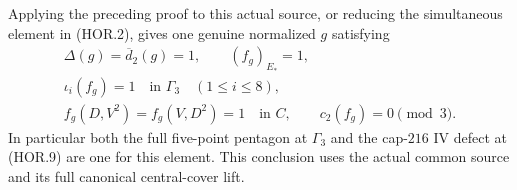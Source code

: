 Applying the preceding proof to this actual source,
or reducing the simultaneous element in (HOR.2),
gives one genuine normalized $g$ satisfying
\[
 \begin{gathered}
 \Delta(g)=\overline d_2(g)=1,\qquad
 (f_g)_{E_*}=1,\\
 \iota_i(f_g)=1\quad\text{in }\Gamma_3
                              \quad(1\leq i\leq8),\\
 f_g(D,V^2)=f_g(V,D^2)=1\quad\text{in }C,
              \qquad c_2(f_g)=0\pmod3.
 \end{gathered}                                        \tag{HOR.10}
\]
In particular both the full five-point pentagon
at $\Gamma_3$ and the cap-$216$ IV defect at
(HOR.9) are one for this element.  This conclusion
uses the actual common source and its full
canonical central-cover lift.
